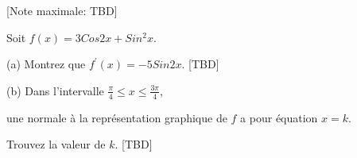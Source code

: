 \begin{question}
  \hspace*{\fill} [Note maximale: TBD]\par
  \medskip
  \noindent Soit $f(x) = 3 Cos2x + Sin^2x$.\par
  \medskip
  (a) Montrez que $f^\prime(x) = -5Sin2x$.\hspace*{\fill} [TBD]\par
  \medskip
  (b) Dans l'intervalle $\frac{\pi}{4} \le x \le \frac{3\pi}{4}$,\par
  \hspace{1em} une normale à la représentation graphique de $f$ a pour équation $ x = k $.\par
  \hspace{1em} Trouvez la valeur de $k$. \hspace*{\fill} [TBD]\par
  \medskip
\end{question}


